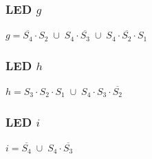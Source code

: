 \subsubsection{\texorpdfstring{\acs{LED} \(g\)}{LED g}} \hspace{4cm} \(\boxed{g = \overline{S_4} \cdot S_2 \;\cup\; S_4 \cdot \overline{S_3} \;\cup\; S_4 \cdot \overline{S_2} \cdot S_1}\)
\subsubsection{\texorpdfstring{\acs{LED} \(h\)}{LED h}} \hspace{4cm} \(\boxed{h = S_3 \cdot S_2 \cdot S_1 \;\cup\; S_4 \cdot S_3 \cdot \overline{S_2}}\)
\subsubsection{\texorpdfstring{\acs{LED} \(i\)}{LED i}} \hspace{4cm} \(\boxed{i = \overline{S_4} \;\cup\; S_4 \cdot \overline{S_3}}\)

